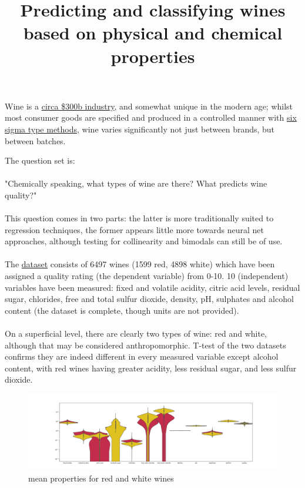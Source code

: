 \documentclass{article}
\begin{document}
\title{Predicting and classifying wines based on physical and chemical properties}
\maketitle
\begin{flushleft}
Wine is a \href{https://www.zionmarketresearch.com/report/wine-market}{circa \$300b industry}, and somewhat unique in the modern age; whilst most consumer goods are 
specified and produced in a controlled manner with \href{https://www.isixsigma.com/new-to-six-sigma/what-six-sigma/}{six sigma type methods}, 
wine varies significantly not just between brands, 
but between batches. 
\end{flushleft}
The question set is:
\\~\\
"Chemically speaking, what types of wine are there? What predicts wine quality?"
\\~\\
This question comes in two parts: the latter is more traditionally suited to regression techniques, 
the former appears little more towards neural net approaches, although testing for collinearity and bimodals
can still be of use.
\\~\\
The \href{http://archive.ics.uci.edu/ml/machine-learning-databases/wine-quality/}{dataset} consists of 6497 wines (1599 red, 4898 white) which have been assigned a quality rating (the dependent variable) from 0-10.  
10 (independent) variables have been measured: fixed and volatile acidity, citric acid levels, residual sugar, chlorides, free and total sulfur dioxide,
density, pH, sulphates and alcohol content (the dataset is complete, though units are not provided). 
\\~\\
On a superficial level, there are clearly two types of wine: red and white, although that may be considered anthropomorphic.  T-test of the two datasets
confirms they are indeed different in every measured variable except alcohol content, with red wines having greater acidity, less residual sugar, and less sulfur dioxide.

\begin{figure}[h]
\includegraphics[width=\linewidth]{figures/red_white_properties_log_axis.png}
\caption{mean properties for red and white wines}
\label{fig:means}
\end{figure}
\end{document}
